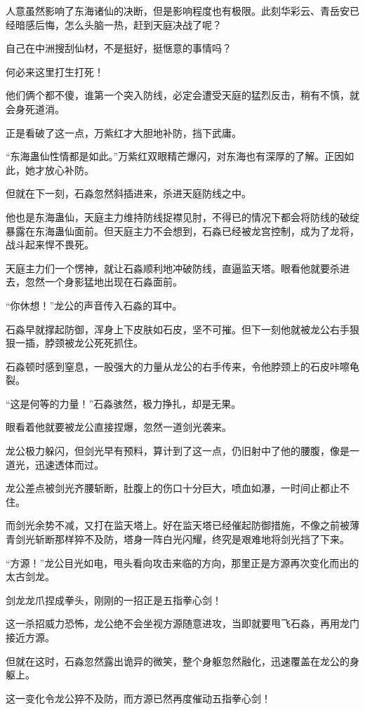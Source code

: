 \begin{this_body}
人意虽然影响了东海诸仙的决断，但是影响程度也有极限。此刻华彩云、青岳安已经暗感后悔，怎么头脑一热，赶到天庭决战了呢？

自己在中洲搜刮仙材，不是挺好，挺惬意的事情吗？

何必来这里打生打死！

他们俩个都不傻，谁第一个突入防线，必定会遭受天庭的猛烈反击，稍有不慎，就会身死道消。

正是看破了这一点，万紫红才大胆地补防，挡下武庸。

“东海蛊仙性情都是如此。”万紫红双眼精芒爆闪，对东海也有深厚的了解。正因如此，她才放心补防。

但就在下一刻，石淼忽然斜插进来，杀进天庭防线之中。

他也是东海蛊仙，天庭主力维持防线捉襟见肘，不得已的情况下都会将防线的破绽暴露在东海蛊仙面前。但天庭主力不会想到，石淼已经被龙宫控制，成为了龙将，战斗起来悍不畏死。

天庭主力们一个愣神，就让石淼顺利地冲破防线，直逼监天塔。眼看他就要杀进去，忽然一个身影猛地出现在石淼面前。

“你休想！”龙公的声音传入石淼的耳中。

石淼早就撑起防御，浑身上下皮肤如石皮，坚不可摧。但下一刻他就被龙公右手狠狠一插，脖颈被龙公死死抓住。

石淼顿时感到窒息，一股强大的力量从龙公的右手传来，令他脖颈上的石皮咔嚓龟裂。

“这是何等的力量！”石淼骇然，极力挣扎，却是无果。

眼看着他就要被龙公直接捏爆，忽然一道剑光袭来。

龙公极力躲闪，但剑光早有预料，算计到了这一点，仍旧射中了他的腰腹，像是一道光，迅速透体而过。

龙公差点被剑光齐腰斩断，肚腹上的伤口十分巨大，喷血如瀑，一时间止都止不住。

而剑光余势不减，又打在监天塔上。好在监天塔已经催起防御措施，不像之前被薄青剑光斩断那样猝不及防，塔身一阵白光闪耀，终究是艰难地将剑光挡了下来。

“方源！”龙公目光如电，甩头看向攻击来临的方向，那里正是方源再次变化而出的太古剑龙。

剑龙龙爪捏成拳头，刚刚的一招正是五指拳心剑！

这一杀招威力恐怖，龙公绝不会坐视方源随意进攻，当即就要甩飞石淼，再用龙门接近方源。

但就在这时，石淼忽然露出诡异的微笑，整个身躯忽然融化，迅速覆盖在龙公的身躯上。

这一变化令龙公猝不及防，而方源已然再度催动五指拳心剑！


\end{this_body}
